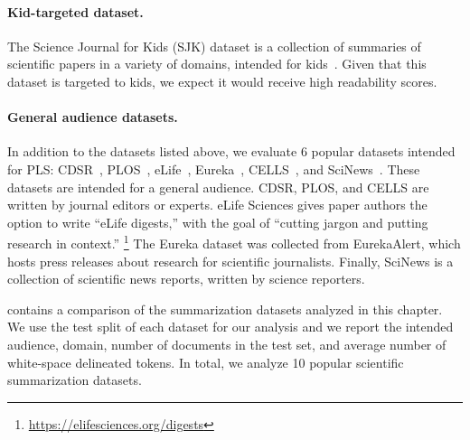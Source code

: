 \paragraph{Kid-targeted dataset.} The Science Journal for Kids (SJK) dataset is a collection of summaries of scientific papers in a variety of domains, intended for kids~\cite{BioLaySumm_2024}. 
Given that this dataset is targeted to kids, we expect it would receive high readability scores.


\paragraph{General audience datasets.} In addition to the datasets listed above, we evaluate 6 popular datasets intended for PLS: CDSR~\cite{Guo2020AutomatedLL}, PLOS~\cite{goldsack2022making}, eLife~\cite{goldsack2022making}, Eureka~\cite{Zaman2020HTSSAN},  CELLS~\cite{Guo2022RetrievalAO}, and SciNews~\cite{cardenas2024scinews}. These datasets are intended for a general audience. CDSR, PLOS, and CELLS are written by journal editors or experts. eLife Sciences gives paper authors the option to write ``eLife digests,'' with the goal of ``cutting jargon and putting research in context.''
\footnote{\url{https://elifesciences.org/digests}} 
The Eureka dataset was collected from EurekaAlert, which hosts press releases about research for scientific journalists.
Finally, SciNews is a collection of scientific news reports, written by science reporters.


 contains a comparison of the summarization datasets analyzed in this chapter. We use the test split of each dataset for our analysis and we report the intended audience, domain, number of documents in the test set, and average number of white-space delineated tokens.
In total, we analyze 10 popular scientific summarization datasets. 



